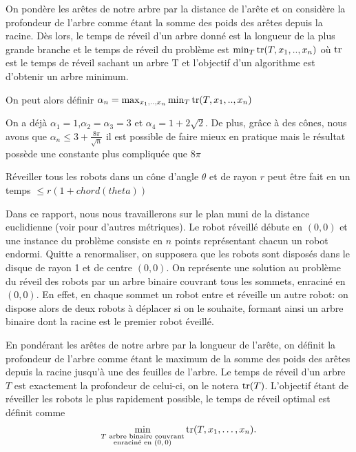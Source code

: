 On pondère les arêtes de notre arbre par la distance de l'arête et on considère la profondeur de l'arbre comme étant la somme des poids des arêtes depuis la racine. Dès lors, le temps de réveil d'un arbre donné est la longueur de la plus grande branche et le temps de réveil du problème est $\min_{T} \operatorname{tr}(T, x_1, .., x_n)$ où $\operatorname{tr}$ est le temps de réveil sachant un arbre T et l'objectif d'un algorithme est d'obtenir un arbre minimum.

On peut alors définir $\alpha_n = \max_{x_1, .., x_n} \min_T \operatorname{tr}(T, x_1, ..,
x_n)$

On a déjà $\alpha_1 = 1$,$\alpha_2 = \alpha_3 = 3$ et $\alpha_4 = 1 + 2\sqrt{2}$. De plus, grâce à des cônes, nous avons que $\alpha_n \leq 3 + \frac{8\pi}{\sqrt{n}}$ il est possible de faire mieux en pratique mais le résultat possède une constante plus compliquée que $8\pi$

\begin{theorem}
  Réveiller tous les robots dans un cône d'angle $\theta$ et de rayon $r$
  peut être fait en un temps $\leq r(1 + chord(theta))$
\end{theorem}



Dans ce rapport, nous nous travaillerons sur le plan muni de la distance
euclidienne (voir \cite{} pour d'autres métriques). Le robot réveillé débute en
$(0,0)$ et une instance du problème consiste en $n$ points représentant chacun
un robot endormi. Quitte a renormaliser, on supposera que les robots sont
disposés dans le disque de rayon 1 et de centre $(0,0)$. On représente une
solution au problème du réveil des robots par un arbre binaire couvrant tous les
sommets, enraciné en $(0, 0)$. En effet, en chaque sommet un robot entre et
réveille un autre robot: on dispose alors de deux robots à déplacer si on le
souhaite, formant ainsi un arbre binaire dont la racine est le premier robot
éveillé.

En pondérant les arêtes de notre arbre par la longueur de l'arête, on définit la
profondeur de l'arbre comme étant le maximum de la somme des poids des arêtes
depuis la racine jusqu'à une des feuilles de l'arbre. Le temps de réveil d'un
arbre $T$ est exactement la profondeur de celui-ci, on le notera
$\operatorname{tr}(T)$. L'objectif étant de réveiller les robots le plus rapidement possible,
le temps de réveil optimal est définit comme
$$\min_{\substack{T \text{ arbre binaire couvrant}\\ \text{enraciné en $(0,0)$}}} \operatorname{tr}(T, x_1, \dots,
  x_n).$$

